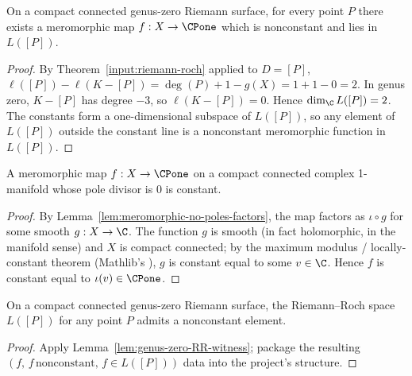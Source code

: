 \begin{lemma}
\label{lem:genus-zero-RR-witness}
On a compact connected genus-zero Riemann surface, for every point
\(P\) there exists a meromorphic map \(f:X\to\CPone\) which is
nonconstant and lies in \(L([P])\).
\leanok
\end{lemma}
\begin{proof}
\leanok
By Theorem~\ref{input:riemann-roch} applied to \(D=[P]\),
\(\ell([P])-\ell(K-[P])=\deg(P)+1-g(X)=1+1-0=2\). In genus zero,
\(K-[P]\) has degree \(-3\), so \(\ell(K-[P])=0\). Hence
\(\dim_{\C}L([P])=2\). The constants form a one-dimensional subspace
of \(L([P])\), so any element of \(L([P])\) outside the constant line
is a nonconstant meromorphic function in \(L([P])\).
\end{proof}

\begin{theorem}
\label{thm:meromorphic-liouville-compact}
A meromorphic map \(f:X\to\CPone\) on a compact connected complex
1-manifold whose pole divisor is \(0\) is constant.
\leanok
\end{theorem}
\begin{proof}
\leanok
By Lemma~\ref{lem:meromorphic-no-poles-factors}, the map factors as
\(\iota\circ g\) for some smooth \(g:X\to\C\). The function \(g\)
is smooth (in fact holomorphic, in the manifold sense) and \(X\) is
compact connected; by the maximum modulus / locally-constant
theorem (Mathlib's
), \(g\)
is constant equal to some \(v\in\C\). Hence \(f\) is constant equal
to \(\iota(v)\in\CPone\).
\end{proof}

\begin{theorem}
\label{thm:genus-zero-exists-nonconstant-mem-L-point}
On a compact connected genus-zero Riemann surface, the Riemann--Roch
space \(L([P])\) for any point \(P\) admits a nonconstant element.
\leanok
\end{theorem}
\begin{proof}
\leanok
Apply Lemma~\ref{lem:genus-zero-RR-witness}; package the resulting
\((f,\,f\,\text{nonconstant},\,f\in L([P]))\) data into the project's
 structure.
\end{proof}

